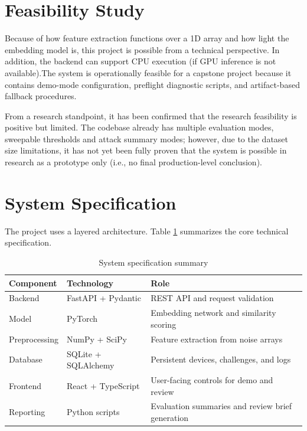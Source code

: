 \section{Feasibility Study}
Because of how feature extraction functions over a 1D array and how light the embedding model is, this project is possible from a technical perspective. In addition, the backend can support CPU execution (if GPU inference is not available).The system is operationally feasible for a capstone project because it contains demo-mode configuration, preflight diagnostic scripts, and artifact-based fallback procedures.

From a research standpoint, it has been confirmed that the research feasibility is positive but limited. The codebase already has multiple evaluation modes, sweepable thresholds and attack summary modes; however, due to the dataset size limitations, it has not yet been fully proven that the system is possible in research as a prototype only (i.e., no final production-level conclusion).

\section{System Specification}
The project uses a layered architecture. Table \ref{tab:specstack} summarizes the core technical specification.

\begin{table}[h!]
	\centering
	\caption{System specification summary}
	\renewcommand{\arraystretch}{1.3}
	\begin{tabular}{|l|l|l|}
		\hline
		\textbf{Component} & \textbf{Technology} & \textbf{Role} \\
		\hline
		Backend & FastAPI + Pydantic & REST API and request validation \\
		Model & PyTorch & Embedding network and similarity scoring \\
		Preprocessing & NumPy + SciPy & Feature extraction from noise arrays \\
		Database & SQLite + SQLAlchemy & Persistent devices, challenges, and logs \\
		Frontend & React + TypeScript & User-facing controls for demo and review \\
		Reporting & Python scripts & Evaluation summaries and review brief generation \\
		\hline
	\end{tabular}
\label{tab:specstack}
\end{table}

